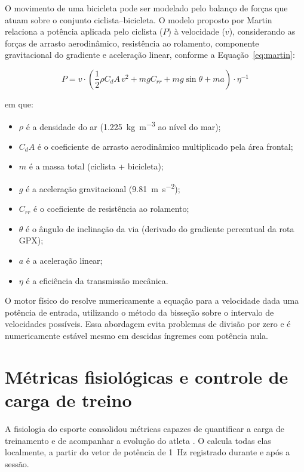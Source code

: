 O movimento de uma bicicleta pode ser modelado pelo balanço de forças que
atuam sobre o conjunto ciclista--bicicleta. O modelo proposto por Martin
\cite{martin1998} relaciona a potência aplicada pelo ciclista ($P$) à
velocidade ($v$), considerando as forças de arrasto aerodinâmico, resistência
ao rolamento, componente gravitacional do gradiente e aceleração linear,
conforme a Equação~\ref{eq:martin}:

\begin{equation}\label{eq:martin}
P = v \cdot \left( \frac{1}{2} \rho C_d A \, v^2 + m g C_{rr} + m g \sin\theta + m a \right) \cdot \eta^{-1}
\end{equation}

\noindent em que:
\begin{itemize}
    \item $\rho$ é a densidade do ar (\SI{1,225}{\kilo\gram\per\cubic\meter}
        ao nível do mar);
    \item $C_d A$ é o coeficiente de arrasto aerodinâmico multiplicado pela
        área frontal;
    \item $m$ é a massa total (ciclista + bicicleta);
    \item $g$ é a aceleração gravitacional
        (\SI{9,81}{\meter\per\square\second});
    \item $C_{rr}$ é o coeficiente de resistência ao rolamento;
    \item $\theta$ é o ângulo de inclinação da via (derivado do gradiente
        percentual da rota GPX);
    \item $a$ é a aceleração linear;
    \item $\eta$ é a eficiência da transmissão mecânica.
\end{itemize}

O motor físico do \argus{} resolve numericamente a equação para a velocidade
dada uma potência de entrada, utilizando o método da bisseção sobre o intervalo
de velocidades possíveis. Essa abordagem evita problemas de divisão por zero e
é numericamente estável mesmo em descidas íngremes com potência nula.

\section{Métricas fisiológicas e controle de carga de treino}
\label{sec:fisiologia}

A fisiologia do esporte consolidou métricas capazes de quantificar a carga de
treinamento e de acompanhar a evolução do atleta \cite{coggan2010}. O \argus{}
calcula todas elas localmente, a partir do vetor de potência de
\SI{1}{\hertz} registrado durante e após a sessão.

